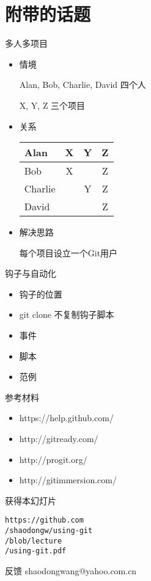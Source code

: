 \part{附带的话题}

\begin{frame}[<+->]{多人多项目}
    \begin{itemize}
        \item 情境

        Alan, Bob, Charlie, David 四个人

        X, Y, Z 三个项目
        \item 关系

\begin{center}
    \begin{tabular}{l|c c c}
        \hline
        Alan    &   X  &  Y  &  Z  \\ \hline
        Bob     &   X  &     &  Z  \\ \hline
        Charlie &      &  Y  &  Z  \\ \hline
        David   &      &     &  Z  \\ \hline
    \end{tabular}
\end{center}

        \item 解决思路

        每个项目设立一个Git用户
    \end{itemize}
\end{frame}


\begin{frame}[<+->][fragile]{钩子与自动化}
    \begin{itemize}
        \item 钩子的位置
        \item git clone 不复制钩子脚本
        \item 事件
        \item 脚本
        \item 范例
    \end{itemize}
\end{frame}

\begin{frame}[fragile]{参考材料}
    \begin{itemize}
        \item https://help.github.com/
        \item http://gitready.com/
        \item http://progit.org/
        \item http://gitimmersion.com/
    \end{itemize}
\end{frame}

\begin{frame}{获得本幻灯片}

{\Huge\tt https://github.com\\
/shaodongw/using-git\\
/blob/lecture\\
/using-git.pdf\\}
\end{frame}

\begin{frame}[<+->][fragile]{反馈}
shaodongwang@yahoo.com.cn
\end{frame}

